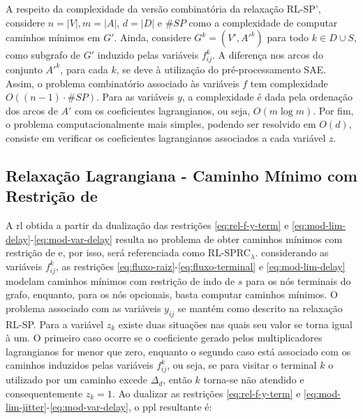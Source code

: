 A respeito da complexidade da versão combinatória da relaxação RL-SP', considere
$n = |V|, m = |A|$, $d =  |D|$ e $\#SP$ como a complexidade de computar caminhos
mínimos em $G'$. Ainda, considere $G^k =  (V', A{'}^{k})$ para todo $k \in D\cup
S$, como subgrafo de $G'$ induzido pelas variáveis $f_{ij}^{k}$. A diferença nos
arcos  do   conjunto  $A{'}^k$,  para  cada   $k$,  se  deve  à   utilização  do
pré-processamento SAE. Assim, o problema combinatório associado às variáveis $f$
tem complexidade $O((n-1) \cdot \#SP)$. Para  as variáveis $y$, a complexidade é
dada pela ordenação dos arcos de $A'$ com os coeficientes lagrangianos, ou seja,
$O(m \log m)$. Por fim, o  problema computacionalmente mais simples, podendo ser
resolvido  em  $O(d)$,  consiste   em  verificar  os  coeficientes  lagrangianos
associados a cada variável $z$.

\subsection{Relaxação Lagrangiana - Caminho Mínimo com Restrição de {\delay}} \label{subsec:rl-sprc-delay}

A \gls{rl} obtida a partir  da dualização das restrições \eqref{eq:rel-f-y-term}
e \eqref{eq:mod-lim-delay}-\eqref{eq:mod-var-delay} resulta no problema de obter
caminhos mínimos com  restrição de {\delay} e, por isso,  será referenciada como
RL-SPRC$_{\lambda}$.  considerando  as  variáveis  $f_{ij}^{k}$,  as  restrições
\eqref{eq:fluxo-raiz}-\eqref{eq:fluxo-terminal}    e    \eqref{eq:mod-lim-delay}
modelam  caminhos mínimos  com restrição  de {\delay}  indo de  $s$ para  os nós
terminais do  grafo, enquanto,  para os nós  opcionais, basta  computar caminhos
mínimos. O problema associado com as  variáveis $y_{ij}$ se mantém como descrito
na relaxação RL-SP. Para a variável  $z_{k}$ existe duas situações nas quais seu
valor se torna igual à um. O  primeiro caso ocorre se o coeficiente gerado pelos
multiplicadores lagrangianos  for menor que  zero, enquanto o segundo  caso está
associado com  os caminhos induzidos  pelas variáveis $f_{ij}^{k}$, ou  seja, se
para  visitar  o  terminal  $k$  o {\delay}  utilizado  por  um  caminho  excede
$\Delta_d$, então  $k$ torna-se não  atendido e  consequentemente $z_k =  1$. Ao
dualizar         as         restrições         \eqref{eq:rel-f-y-term}         e
\eqref{eq:mod-lim-jitter}-\eqref{eq:mod-var-delay}, o \gls{ppl} resultante é:

